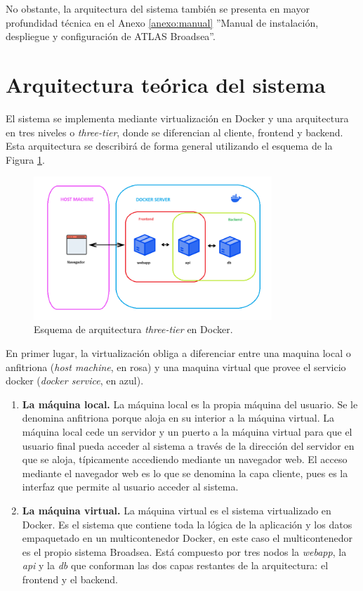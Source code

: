 No obstante, la arquitectura del sistema también se presenta en mayor profundidad técnica en el Anexo \ref{anexo:manual} ''Manual de instalación, despliegue y configuración de ATLAS Broadsea''.

\section{Arquitectura teórica del sistema} \label{sec:08teorica}

El sistema se implementa mediante virtualización en Docker y una arquitectura en tres niveles o \textit{three-tier}, donde se diferencian al cliente, frontend y backend. Esta arquitectura se describirá de forma general utilizando el esquema de la Figura \ref{fig:threeTierValle}.

\begin{figure}[H]
    \centering
    \includegraphics[width=0.80\textwidth]{figures/threeTierValle.png}
    \caption{Esquema de arquitectura \textit{three-tier} en Docker.}
    \label{fig:threeTierValle}
\end{figure}

En primer lugar, la virtualización obliga a diferenciar entre una maquina local o anfitriona (\textit{host machine}, en rosa) y una maquina virtual que provee el servicio docker (\textit{docker service}, en azul). 

\begin{enumerate}

    \item \textbf{La máquina local.} La máquina local es la propia máquina del usuario. Se le denomina anfitriona porque aloja en su interior a la máquina virtual. La máquina local cede un servidor y un puerto a la máquina virtual para que el usuario final pueda acceder al sistema a través de la dirección del servidor en que se aloja, típicamente accediendo mediante un navegador web. El acceso mediante el navegador web es lo que se denomina la capa cliente, pues es la interfaz que permite al usuario acceder al sistema. 

    \item \textbf{La máquina virtual.} La máquina virtual es el sistema virtualizado en Docker. Es el sistema que contiene toda la lógica de la aplicación y los datos empaquetado en un multicontenedor Docker, en este caso el multicontenedor es el propio sistema Broadsea. Está compuesto por tres nodos la \textit{webapp}, la \textit{api} y la \textit{db} que conforman las dos capas restantes de la arquitectura: el frontend y el backend.
    
\end{enumerate}

